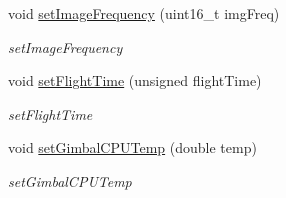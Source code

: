 \begin{DoxyCompactItemize}
void \hyperlink{classwtl_1_1_source_meta_data_a361f603d20e3084820e3869e19ec8f40}{set\+Image\+Frequency} (uint16\+\_\+t img\+Freq)
\begin{DoxyCompactList}\small\item\em set\+Image\+Frequency \end{DoxyCompactList}\item 
void \hyperlink{classwtl_1_1_source_meta_data_a8db9b3b0c1e0507ba75ae2cb6f26cb96}{set\+Flight\+Time} (unsigned flight\+Time)
\begin{DoxyCompactList}\small\item\em set\+Flight\+Time \end{DoxyCompactList}\item 
void \hyperlink{classwtl_1_1_source_meta_data_a46aa7e06e6358d6e1bf5a297ce2c9621}{set\+Gimbal\+C\+P\+U\+Temp} (double temp)
\begin{DoxyCompactList}\small\item\em set\+Gimbal\+C\+P\+U\+Temp \end{DoxyCompactList}\end{DoxyCompactItemize}
